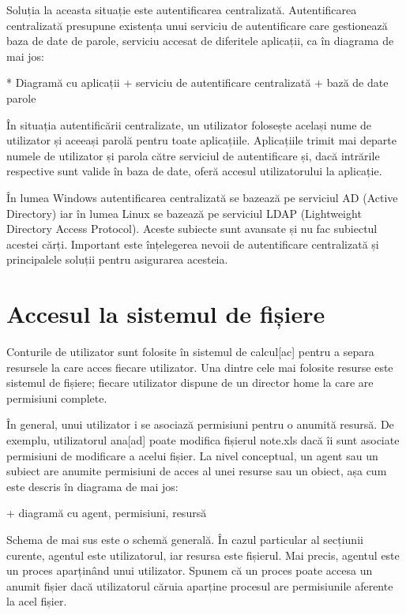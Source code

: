 Soluția la aceasta situație este autentificarea centralizată. Autentificarea
centralizată presupune existența unui serviciu de autentificare care gestionează
baza de date de parole, serviciu accesat de diferitele aplicații, ca în diagrama
de mai jos:

* Diagramă cu aplicații + serviciu de autentificare centralizată + bază de date parole

În situația autentificării centralizate, un utilizator folosește același nume de
utilizator și aceeași parolă pentru toate aplicațiile. Aplicațiile trimit mai
departe numele de utilizator și parola către serviciul de autentificare și, dacă
intrările respective sunt valide în baza de date, oferă accesul utilizatorului
la aplicație.

În lumea Windows autentificarea centralizată se bazează pe serviciul AD (Active
Directory) iar în lumea Linux se bazează pe serviciul LDAP (Lightweight
Directory Access Protocol). Aceste subiecte sunt avansate și nu fac subiectul
acestei cărți. Important este înțelegerea nevoii de autentificare centralizată
și principalele soluții pentru asigurarea acesteia.

\section{Accesul la sistemul de fișiere}
\label{sec:users-fs}

Conturile de utilizator sunt folosite în sistemul de calcul[ac] pentru a separa
resursele la care acces fiecare utilizator. Una dintre cele mai folosite resurse
este sistemul de fișiere; fiecare utilizator dispune de un director home la care
are permisiuni complete.

În general, unui utilizator i se asociază permisiuni pentru o anumită resursă.
De exemplu, utilizatorul ana[ad] poate modifica fișierul note.xls dacă îi sunt
asociate permisiuni de modificare a acelui fișier. La nivel conceptual, un agent
sau un subiect are anumite permisiuni de acces al unei resurse sau un obiect,
așa cum este descris în diagrama de mai jos:

+ diagramă cu agent, permisiuni, resursă

Schema de mai sus este o schemă generală. În cazul particular al secțiunii
curente, agentul este utilizatorul, iar resursa este fișierul. Mai precis,
agentul este un proces aparținând unui utilizator. Spunem că un proces poate
accesa un anumit fișier dacă utilizatorul căruia aparține procesul are
permisiunile aferente la acel fișier.

